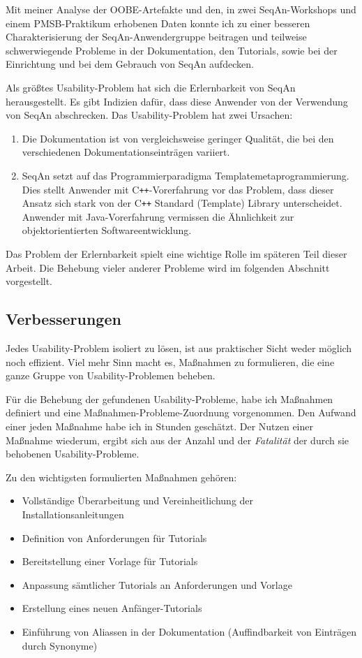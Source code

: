 Mit meiner Analyse der OOBE-Artefakte und den, in zwei SeqAn-Workshops und einem PMSB-Praktikum erhobenen Daten konnte ich zu einer besseren Charakterisierung der SeqAn-Anwendergruppe beitragen und teilweise schwerwiegende Probleme in der Dokumentation, den Tutorials, sowie bei der Einrichtung und bei dem Gebrauch von SeqAn aufdecken.

Als größtes Usability-Problem hat sich die Erlernbarkeit von SeqAn herausgestellt. Es gibt Indizien dafür, dass diese Anwender von der Verwendung von SeqAn abschrecken. Das Usability-Problem hat zwei Ursachen:
\begin{enumerate}
  \item Die Dokumentation ist von vergleichsweise geringer Qualität, die bei den verschiedenen Dokumentationseinträgen variiert.
  \item SeqAn setzt auf das Programmierparadigma Templatemetaprogrammierung. Dies stellt Anwender mit C{}\verb!++!-Vorerfahrung vor das Problem, dass dieser Ansatz sich stark von der C{}\verb!++! Standard (Template) Library unterscheidet. Anwender mit Java-Vorerfahrung vermissen die Ähnlichkeit zur objektorientierten Softwareentwicklung.
\end{enumerate}

Das Problem der Erlernbarkeit spielt eine wichtige Rolle im späteren Teil dieser Arbeit. Die Behebung vieler anderer Probleme wird im folgenden Abschnitt vorgestellt.





\subsection{Verbesserungen}

Jedes Usability-Problem isoliert zu lösen, ist aus praktischer Sicht weder möglich noch effizient. Viel mehr Sinn macht es, Maßnahmen zu formulieren, die eine ganze Gruppe von Usability-Problemen beheben.

Für die Behebung der gefundenen Usability-Probleme, habe ich Maßnahmen definiert und eine Maßnahmen-Probleme-Zuordnung vorgenommen. Den Aufwand einer jeden Maßnahme habe ich in Stunden geschätzt. Der Nutzen einer Maßnahme wiederum, ergibt sich aus der Anzahl und der \textit{Fatalität} der durch sie behobenen Usability-Probleme.

Zu den wichtigsten formulierten Maßnahmen gehören:
\begin{itemize}
\itemsep1pt\parskip0pt
  \item Vollständige Überarbeitung und Vereinheitlichung der Installationsanleitungen
  \item Definition von Anforderungen für Tutorials
  \item Bereitstellung einer Vorlage für Tutorials
  \item Anpassung sämtlicher Tutorials an Anforderungen und Vorlage
  \item Erstellung eines neuen Anfänger-Tutorials
  \item Einführung von Aliassen in der Dokumentation (Auffindbarkeit von Einträgen durch Synonyme)
\end{itemize}

